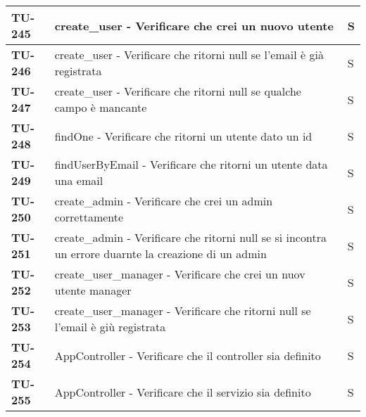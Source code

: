 \begin{longtable}{|>{\centering\arraybackslash}p{2cm}|p{15cm}|p{1cm}|}
  \hline
  \rowcolor{gray!10}
  \textbf{TU-245} & create\_user - Verificare che crei un nuovo utente  & S \\ 
  \hline
  \rowcolor{gray!10}
  \textbf{TU-246} & create\_user - Verificare che ritorni null se l'email è già registrata  & S \\ 
  \hline
  \rowcolor{gray!10}
  \textbf{TU-247} & create\_user - Verificare che ritorni null se qualche campo è mancante  & S \\ 
  \hline
  \rowcolor{gray!10}
  \textbf{TU-248} & findOne - Verificare che ritorni un utente dato un id   & S \\ 
  \hline
  \rowcolor{gray!10}
  \textbf{TU-249} & findUserByEmail - Verificare che ritorni un utente data una email  & S \\ 
  \hline
  \rowcolor{gray!10}
  \textbf{TU-250} & create\_admin - Verificare che crei un admin correttamente  & S \\ 
  \hline
  \rowcolor{gray!10}
  \textbf{TU-251} & create\_admin - Verificare che ritorni null se si incontra un errore duarnte la creazione di un admin  & S \\ 
  \hline
  \rowcolor{gray!10}
  \textbf{TU-252} & create\_user\_manager - Verificare che crei un nuov utente manager  & S \\ 
  \hline
  \rowcolor{gray!10}
  \textbf{TU-253} & create\_user\_manager - Verificare che ritorni null se l'email è giù registrata  & S \\ 
  \hline
  \rowcolor{gray!10}
  \textbf{TU-254} & AppController - Verificare che il controller sia definito  & S \\ 
  \hline
  \rowcolor{gray!10}
  \textbf{TU-255} & AppController - Verificare che il servizio sia definito  & S \\ 
  \hline



\end{longtable}
